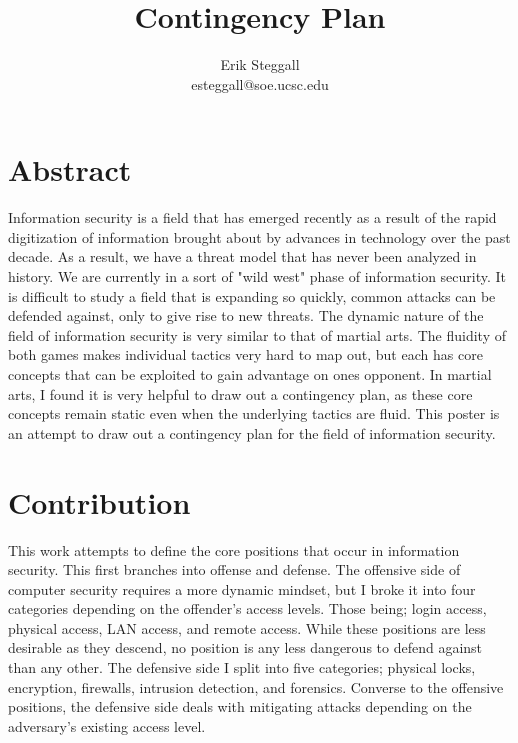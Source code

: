\documentclass{article}
\title{Contingency Plan}
\author{Erik Steggall \\ esteggall@soe.ucsc.edu}
\date{}
\begin{document}
\pagestyle{empty}
\maketitle

\section{Abstract}


Information security is a field that has emerged recently as a result of the rapid digitization of information brought about by advances in technology over the past decade. As a result, we have a threat model that has never been analyzed in history. We are currently in a sort of "wild west" phase of information security. It is difficult to study a field that is expanding so quickly, common attacks can be defended against, only to give rise to new threats. The dynamic nature of the field of information security is very similar to that of martial arts. The fluidity of both games makes individual tactics very hard to map out, but each has core concepts that can be exploited to gain advantage on ones opponent. In martial arts, I found it is very helpful to draw out a contingency plan, as these core concepts remain static even when the underlying tactics are fluid. This poster is an attempt to draw out a contingency plan for the field of information security. 

\section{Contribution}

This work attempts to define the core positions that occur in information security. This first branches into offense and defense. The offensive side of computer security requires a more dynamic mindset, but I broke it into four categories depending on the offender's access levels. Those being; login access, physical access, LAN access, and remote access. While these positions are less desirable as they descend, no position is any less dangerous to defend against than any other. The defensive side I split into five categories; physical locks, encryption, firewalls, intrusion detection, and forensics. Converse to the offensive positions, the defensive side deals with mitigating attacks depending on the adversary's existing access level. \\
\end{document}
